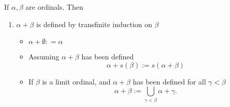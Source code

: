 \begin{definition}
    If $\alpha, \beta$ are ordinals.
    Then 
    \begin{enumerate}[label=\arabic*)]
        \item $\alpha + \beta$ is defined by transfinite induction on $\beta$
        \begin{itemize}
            \item $\alpha + \emptyset : = \alpha$
            \item Assuming $\alpha + \beta$ has been defined
            $$\alpha + s(\beta) := s(\alpha + \beta)$$
            \item If $\beta$ is a limit ordinal, and $\alpha + \beta$ has been defined for all $\gamma < \beta$
            $$ \alpha + \beta := \bigcup_{\gamma < \beta} \alpha + \gamma. $$
        \end{itemize}
    \end{enumerate}
\end{definition}